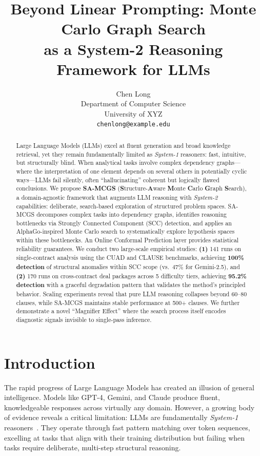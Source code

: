 \documentclass{article}
\title{Beyond Linear Prompting: Monte Carlo Graph Search\\as a System-2 Reasoning Framework for LLMs}
\author{%
  Chen Long \\
  Department of Computer Science\\
  University of XYZ \\
  \texttt{chenlong@example.edu} \\
}
\begin{document}
\maketitle

\begin{abstract}
Large Language Models (LLMs) excel at fluent generation and broad knowledge retrieval, yet they remain fundamentally limited as \emph{System-1} reasoners: fast, intuitive, but structurally blind. When analytical tasks involve complex dependency graphs---where the interpretation of one element depends on several others in potentially cyclic ways---LLMs fail silently, often ``hallucinating'' coherent but logically flawed conclusions. We propose \textbf{SA-MCGS} (\textbf{S}tructure-\textbf{A}ware \textbf{M}onte \textbf{C}arlo \textbf{G}raph \textbf{S}earch), a domain-agnostic framework that augments LLM reasoning with \emph{System-2} capabilities: deliberate, search-based exploration of structured problem spaces. SA-MCGS decomposes complex tasks into dependency graphs, identifies reasoning bottlenecks via Strongly Connected Component (SCC) detection, and applies an AlphaGo-inspired Monte Carlo search to systematically explore hypothesis spaces within these bottlenecks. An Online Conformal Prediction layer provides statistical reliability guarantees. We conduct two large-scale empirical studies: \textbf{(1)} 141 runs on single-contract analysis using the CUAD and CLAUSE benchmarks, achieving \textbf{100\% detection} of structural anomalies within SCC scope (vs.\ 47\% for Gemini-2.5), and \textbf{(2)} 170 runs on cross-contract deal packages across 5 difficulty tiers, achieving \textbf{95.2\% detection} with a graceful degradation pattern that validates the method's principled behavior. Scaling experiments reveal that pure LLM reasoning collapses beyond 60--80 clauses, while SA-MCGS maintains stable performance at 500+ clauses. We further demonstrate a novel ``Magnifier Effect'' where the search process itself encodes diagnostic signals invisible to single-pass inference.
\end{abstract}

\section{Introduction}

The rapid progress of Large Language Models has created an illusion of general intelligence. Models like GPT-4, Gemini, and Claude produce fluent, knowledgeable responses across virtually any domain. However, a growing body of evidence reveals a critical limitation: LLMs are fundamentally \emph{System-1} reasoners~\cite{kahneman}. They operate through fast pattern matching over token sequences, excelling at tasks that align with their training distribution but failing when tasks require deliberate, multi-step structural reasoning.
\end{document}
